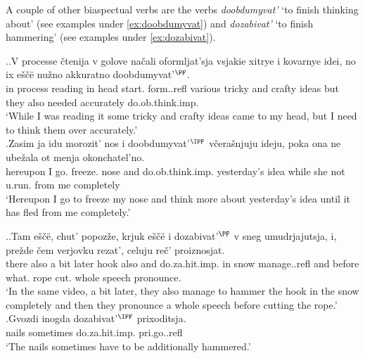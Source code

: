 A couple of other biaspectual verbs are the verbs \textit{doobdumyvat'} `to finish thinking about' (see examples under \ref{ex:doobdumyvat}) and \textit{dozabivat'} `to finish hammering' (see examples under \ref{ex:dozabivat}).

\ex.\label{ex:doobdumyvat}\ag.V processe \v{c}tenija v golove na\v{c}ali oformljat'sja vsjakie xitrye i kovarnye idei, no ix e\v{s}\v{c}\"{e} nu\v{z}no akkuratno doobdumyvat'$^{\PF}$.\\
in process reading in head start. form..refl various tricky and crafty ideas but they also needed accurately do.ob.think.imp.\\
\trans `While I was reading it some tricky and crafty ideas came to my head, but I need to think them over accurately.'\\
\bg.Zasim ja idu morozit' nos i doobdumyvat'$^{\IPF}$ v\v{c}era\v{s}njuju ideju, poka ona ne ube\v{z}ala ot menja okonchatel'no.\\
hereupon I go. freeze. nose and do.ob.think.imp. yesterday's idea while she not u.run. from me completely\\
\trans `Hereupon I go to freeze my nose and think more about yesterday's idea until it has fled from me completely.'


\ex.\label{ex:dozabivat}\ag.Tam e\v{s}\v{c}\"{e}, chut' popoz\v{z}e, krjuk e\v{s}\v{c}\"{e} i dozabivat'$^{\PF}$ v sneg umudrjajutsja, i, pre\v{z}de \v{c}em verjovku rezat', celuju re\v{c}' proiznosjat.\\
there also {a bit} later hook also and do.za.hit.imp. in snow manage..refl and before what. rope cut. whole speech pronounce.\\
\trans `In the same video, a bit later, they also manage to hammer the hook in the snow completely and then they pronounce a whole speech before cutting the rope.'
\bg.Gvozdi inogda dozabivat'$^{\IPF}$ prixoditsja.\\
nails sometimes do.za.hit.imp. pri.go..refl\\
\trans `The nails sometimes have to be additionally hammered.'\\

